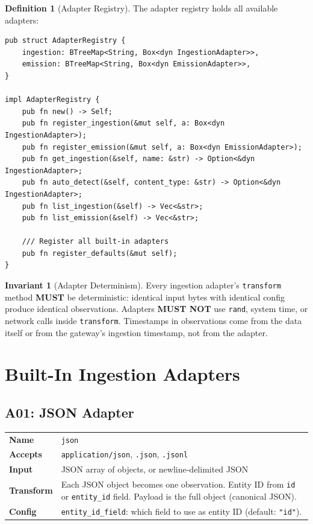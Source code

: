 \documentclass[11pt,a4paper,twoside]{article}
\theoremstyle{definition}
\newtheorem{definition}{Definition}[section]
\newtheorem{invariant}{Invariant}[section]
\theoremstyle{plain}
\theoremstyle{remark}
\begin{document}
\begin{definition}[Adapter Registry]\label{def:adapterreg}
The adapter registry holds all available adapters:
\begin{lstlisting}
pub struct AdapterRegistry {
    ingestion: BTreeMap<String, Box<dyn IngestionAdapter>>,
    emission: BTreeMap<String, Box<dyn EmissionAdapter>>,
}

impl AdapterRegistry {
    pub fn new() -> Self;
    pub fn register_ingestion(&mut self, a: Box<dyn IngestionAdapter>);
    pub fn register_emission(&mut self, a: Box<dyn EmissionAdapter>);
    pub fn get_ingestion(&self, name: &str) -> Option<&dyn IngestionAdapter>;
    pub fn auto_detect(&self, content_type: &str) -> Option<&dyn IngestionAdapter>;
    pub fn list_ingestion(&self) -> Vec<&str>;
    pub fn list_emission(&self) -> Vec<&str>;

    /// Register all built-in adapters
    pub fn register_defaults(&mut self);
}
\end{lstlisting}
\end{definition}

\begin{invariant}[Adapter Determinism]\label{inv:adapterdet}
Every ingestion adapter's \texttt{transform} method \textbf{MUST} be
deterministic: identical input bytes with identical config produce
identical observations. Adapters \textbf{MUST NOT} use
\texttt{rand}, system time, or network calls inside
\texttt{transform}. Timestamps in observations come from the data
itself or from the gateway's ingestion timestamp, not from the
adapter.
\end{invariant}


\section{Built-In Ingestion Adapters}\label{sec:ad:ingestion}

\subsection{A01: JSON Adapter}

\begin{tabularx}{\textwidth}{l X}
\toprule
\textbf{Name} & \texttt{json} \\
\textbf{Accepts} & \texttt{application/json}, \texttt{.json}, \texttt{.jsonl} \\
\textbf{Input} & JSON array of objects, or newline-delimited JSON \\
\textbf{Transform} & Each JSON object becomes one observation. Entity
  ID from \texttt{id} or \texttt{entity\_id} field. Payload is the
  full object (canonical JSON). \\
\textbf{Config} & \texttt{entity\_id\_field}: which field to use as
  entity ID (default: \texttt{"id"}). \\
\bottomrule
\end{tabularx}
\end{document}
